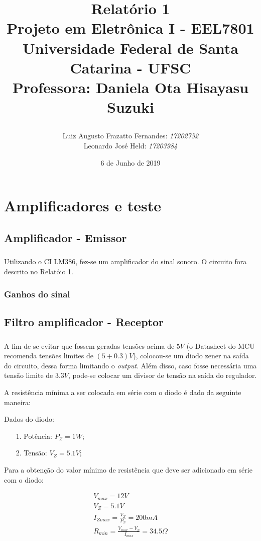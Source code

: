 \documentclass[12pt,a4paper]{report}
\title{Relatório 1  \\
	Projeto em Eletrônica I - EEL7801 \\ \vfill
	\normalsize{Universidade Federal de Santa Catarina - UFSC \\
		Professora: Daniela Ota Hisayasu Suzuki}
	\author{
		{Luiz Augusto Frazatto Fernandes: \it{17202752}} \\
		{Leonardo José Held: \it{17203984}}
	}
}
\date{6 de Junho de 2019}
\begin{document}
	\maketitle
	\setcounter{chapter}{0}
	\chapter{Amplificadores e teste}
	\section{Amplificador - Emissor}
		\paragraph{} Utilizando o CI LM386, fez-se um amplificador do sinal sonoro. O circuito fora descrito no Relatóio 1.
	\subsection{Ganhos do sinal}
	\section{Filtro amplificador - Receptor}
		\paragraph{} A fim de se evitar que fossem geradas tensões acima de $5V$ (o Datasheet do MCU recomenda tensões limites de $(5+0.3)V$), colocou-se um diodo zener na saída do circuito, dessa forma limitando o {\it output}. Além disso, caso fosse necessária uma tensão limite de $3.3V$, pode-se colocar um divisor de tensão na saída do regulador.
		
		A resistência mínima a ser colocada em série com o diodo é dado da seguinte maneira:
		
		Dados do diodo:
		\begin{itemize}
			\item[1.] Potência: $P_Z = 1W$;
			\item[2.] Tensão: $V_Z = 5.1V$;
		\end{itemize}
		
		Para a obtenção do valor mínimo de resistência que deve ser adicionado em série com o diodo:
		
		\begin{center}
			\begin{gather}
				V_{max} = 12V\\
				V_Z = 5.1V\\
				I_{Zmax} = \frac{V_Z}{P_Z} = 200mA\\
				R_{min} = \frac{V_{max} - V_Z}{I_{max}} = 34.5\Omega\\
			\end{gather}
		\end{center}
		
\end{document}
